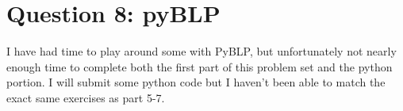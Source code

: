 \documentclass[11pt]{article} %
\begin{document}
\section{Question 8: pyBLP}
I have had time to play around some with PyBLP, but unfortunately not nearly enough time to complete both the first part of this problem set and the python portion. I will submit some python code but I haven't been able to match the exact same exercises as part 5-7.
\end{document}
